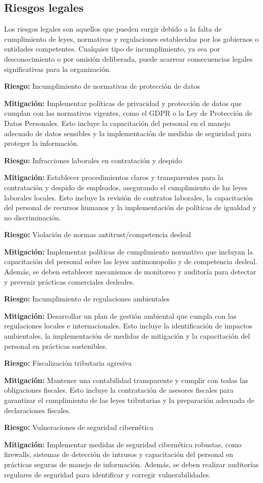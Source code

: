 \subsection{Riesgos legales}
Los riesgos legales son aquellos que pueden surgir debido a la falta de cumplimiento de leyes, normativas y regulaciones establecidas por los gobiernos o entidades competentes. Cualquier tipo de incumplimiento, ya sea por desconocimiento o por omisión deliberada, puede acarrear consecuencias legales significativas para la organización.

\textbf{Riesgo:} Incumplimiento de normativas de protección de datos

\textbf{Mitigación:} Implementar políticas de privacidad y protección de datos que cumplan con las normativas vigentes, como el GDPR o la Ley de Protección de Datos Personales. Esto incluye la capacitación del personal en el manejo adecuado de datos sensibles y la implementación de medidas de seguridad para proteger la información.

\textbf{Riesgo:} Infracciones laborales en contratación y despido

\textbf{Mitigación:} Establecer procedimientos claros y transparentes para la contratación y despido de empleados, asegurando el cumplimiento de las leyes laborales locales. Esto incluye la revisión de contratos laborales, la capacitación del personal de recursos humanos y la implementación de políticas de igualdad y no discriminación.

\textbf{Riesgo:} Violación de normas antitrust/competencia desleal

\textbf{Mitigación:} Implementar políticas de cumplimiento normativo que incluyan la capacitación del personal sobre las leyes antimonopolio y de competencia desleal. Además, se deben establecer mecanismos de monitoreo y auditoría para detectar y prevenir prácticas comerciales desleales.

\textbf{Riesgo:} Incumplimiento de regulaciones ambientales

\textbf{Mitigación:} Desarrollar un plan de gestión ambiental que cumpla con las regulaciones locales e internacionales. Esto incluye la identificación de impactos ambientales, la implementación de medidas de mitigación y la capacitación del personal en prácticas sostenibles.

\textbf{Riesgo:} Fiscalización tributaria agresiva

\textbf{Mitigación:} Mantener una contabilidad transparente y cumplir con todas las obligaciones fiscales. Esto incluye la contratación de asesores fiscales para garantizar el cumplimiento de las leyes tributarias y la preparación adecuada de declaraciones fiscales.

\textbf{Riesgo:} Vulneraciones de seguridad cibernética

\textbf{Mitigación:} Implementar medidas de seguridad cibernética robustas, como firewalls, sistemas de detección de intrusos y capacitación del personal en prácticas seguras de manejo de información. Además, se deben realizar auditorías regulares de seguridad para identificar y corregir vulnerabilidades.